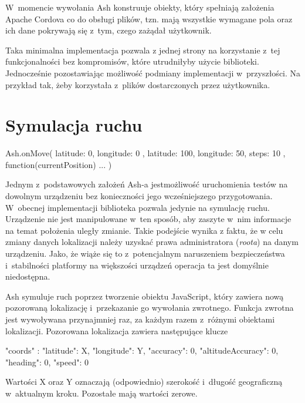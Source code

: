 \documentclass[brudnopis]{xmgr}
\begin{document}
W~momencie wywołania Ash konstruuje obiekty, który spełniają założenia Apache Cordova co do obsługi plików, tzn. mają wszystkie wymagane pola oraz ich dane pokrywają się z~tym, czego zażądał użytkownik. 

Taka minimalna implementacja pozwala z jednej strony  na korzystanie z~tej funkcjonalności bez kompromisów, które utrudniłyby użycie biblioteki. Jednocześnie pozostawiając możliwość podmiany implementacji w~przyszłości. Na przykład tak, żeby korzystała z~plików dostarczonych przez użytkownika.

\section{Symulacja ruchu}

\begin{javascriptcode}
Ash.onMove({
    latitude: 0, 
    longitude: 0
}, {
    latitude: 100, 
    longitude: 50, 
    steps: 10
}, function(currentPosition){ ... })
\end{javascriptcode}

Jednym z~podstawowych założeń Ash-a jestmożliwość uruchomienia testów na dowolnym urządzeniu bez konieczności jego wcześniejszego przygotowania. W~obecnej implementacji biblioteka pozwala jedynie na symulację ruchu. Urządzenie nie jest manipulowane w~ten sposób, aby zaszyte w~nim informacje na temat położenia uległy zmianie. Takie podejście wynika z faktu, że w celu zmiany danych lokalizacji należy uzyskać prawa administratora (\textit{roota}) na danym urządzeniu. Jako, że wiąże się to z~potencjalnym naruszeniem bezpieczeństwa i~stabilności platformy na większości urządzeń operacja ta jest domyślnie niedostępna. 

Ash symuluje ruch poprzez tworzenie obiektu JavaScript, który zawiera nową pozorowaną lokalizację i~przekazanie go wywołania zwrotnego. Funkcja zwrotna jest wywoływana przynajmniej raz, za każdym razem z~różnymi obiektami lokalizacji. Pozorowana lokalizacja zawiera następujące klucze

\begin{javascriptcode}

{
  "coords" :  {
      "latitude": X, 
      "longitude": Y,
      "accuracy": 0, 
      "altitudeAccuracy": 0, 
      "heading": 0, 
      "speed": 0
   }
}

\end{javascriptcode}

Wartości X oraz Y oznaczają (odpowiednio) szerokość i~długość geograficzną w~aktualnym kroku. Pozostałe mają wartości zerowe.   
\end{document}
